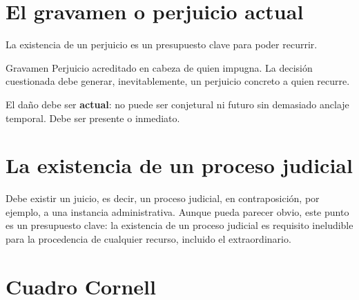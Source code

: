 \documentclass[12pt,oneside]{book}
\begin{document}
\section{El gravamen o perjuicio actual}

La existencia de un perjuicio es un presupuesto clave para poder recurrir.

\begin{definition}{Gravamen}
Perjuicio acreditado en cabeza de quien impugna. La decisión cuestionada debe generar, inevitablemente, un perjuicio concreto a quien recurre.
\end{definition}

\begin{important}
El daño debe ser \textbf{actual}: no puede ser conjetural ni futuro sin demasiado anclaje temporal. Debe ser presente o inmediato.
\end{important}

\section{La existencia de un proceso judicial}

Debe existir un juicio, es decir, un proceso judicial, en contraposición, por ejemplo, a una instancia administrativa. Aunque pueda parecer obvio, este punto es un presupuesto clave: la existencia de un proceso judicial es requisito ineludible para la procedencia de cualquier recurso, incluido el extraordinario.

\clearpage
\section{Cuadro Cornell}
\end{document}
